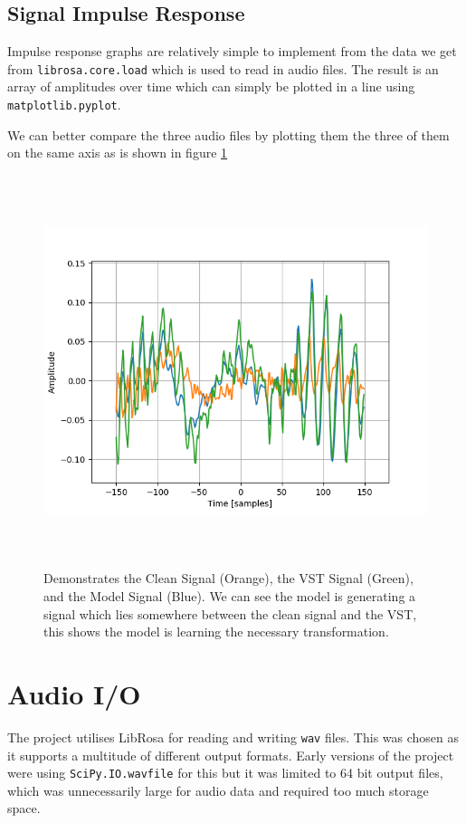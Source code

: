 \documentclass{l4proj}
\begin{document}
\subsection{Signal Impulse Response}\label{signal-impulse-response}

Impulse response graphs are relatively simple to implement from the data
we get from \texttt{librosa.core.load} which is used to read in audio
files. The result is an array of amplitudes over time which can simply
be plotted in a line using \texttt{matplotlib.pyplot}.

We can better compare the three audio files by plotting them the three
of them on the same axis as is shown in figure \ref{fig:axisshare}

\begin{figure}
\centering
\includegraphics[width=6.00000in,height=4.50000in]{images/axisshare.png}
\caption{Demonstrates the Clean Signal (Orange), the VST Signal (Green),
and the Model Signal (Blue). We can see the model is generating a signal
which lies somewhere between the clean signal and the VST, this shows
the model is learning the necessary
transformation.\label{fig:axisshare}}
\end{figure}

\section{Audio I/O}\label{audio-io}

The project utilises LibRosa for reading and writing \texttt{wav} files.
This was chosen as it supports a multitude of different output formats.
Early versions of the project were using \texttt{SciPy.IO.wavfile} for
this but it was limited to 64 bit output files, which was unnecessarily
large for audio data and required too much storage space.
\end{document}
